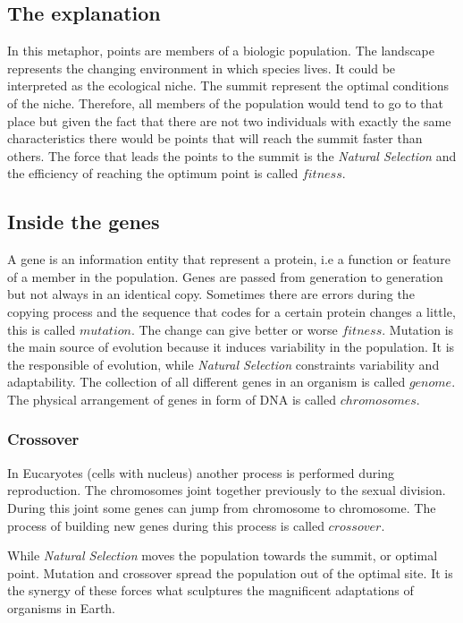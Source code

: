 \documentclass{article}
\begin{document}
\subsection{The explanation}
In this metaphor, points are members of a biologic population. The landscape represents the changing environment in which species lives. It could be interpreted as the ecological niche.
The summit represent the optimal conditions of the niche. Therefore, all members of the population would tend to go to that place but given the fact that there are not two individuals with exactly the same characteristics there would be points that will reach the summit faster than others. The force that leads the points to the summit is the {\em Natural Selection} and the efficiency of reaching the optimum point is called $fitness$. 

\subsection{Inside the genes}
A gene is an information entity that represent a protein, i.e a function or feature of a member in the population. Genes are passed from generation to generation but not always in an identical copy. Sometimes there are errors during the copying process and the sequence that codes for a certain protein changes a little, this is called $mutation$. The change can give better or worse $fitness$. Mutation is the main source of evolution because it induces variability in the population. It is the responsible of evolution, while {\em Natural Selection} constraints variability and adaptability. The collection of all different genes in an organism is called $genome$. The physical arrangement of genes in form of DNA is called $chromosomes$.

\subsubsection{Crossover}
In Eucaryotes (cells with nucleus) another process is performed during reproduction. The chromosomes joint together previously to the sexual division. During this joint some genes can jump from chromosome to chromosome. The process of building new genes during this process is called $crossover$. 


While {\em Natural Selection} moves the population towards the summit, or optimal point. Mutation and crossover spread the population out of the optimal site. It is the synergy of these forces what sculptures the magnificent adaptations of organisms in Earth.
\end{document}
